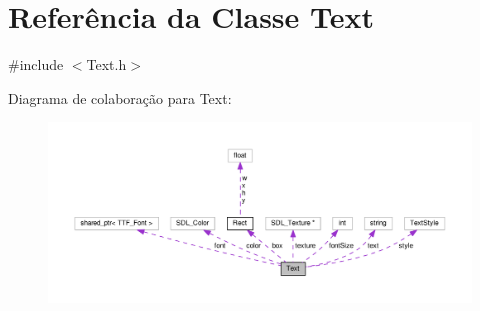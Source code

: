 \hypertarget{classText}{\section{Referência da Classe Text}
\label{classText}
}


{\ttfamily \#include $<$Text.\+h$>$}



Diagrama de colaboração para Text\+:
\nopagebreak
\begin{figure}[H]
\begin{center}
\leavevmode
\includegraphics[width=350pt]{classText__coll__graph}
\end{center}
\end{figure}
